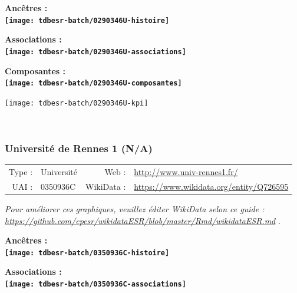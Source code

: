 \documentclass[12pt,french,]{article}
\begin{document}
\vspace{1cm}  
\begin{minipage}[b]{0.50\textwidth}\begin{center} \bf Ancêtres : \\  
\texttt{[image: tdbesr-batch/0290346U-histoire]} \end{center}\end{minipage}\begin{minipage}[b]{0.50\textwidth}\begin{center} \bf Associations : \\  
\texttt{[image: tdbesr-batch/0290346U-associations]} \end{center}\end{minipage}

\hrulefill

\begin{center} \bf Composantes : \\  
\texttt{[image: tdbesr-batch/0290346U-composantes]} \end{center}

\begin{center}\texttt{[image: tdbesr-batch/0290346U-kpi]} \end{center}\checkoddpage

\ifoddpage \fi ~\newpage  

\hypertarget{universituxe9-de-rennes-1-na}{%
\subsubsection{Université de Rennes 1
(N/A)}\label{universituxe9-de-rennes-1-na}}

\begin{tabular*}{\textwidth}{rp{5cm}rl}  
\hline  
Type : & Université & Web : &\href{http://www.univ-rennes1.fr/}{http://www.univ-rennes1.fr/} \\  
UAI : & 0350936C & WikiData : & \href{https://www.wikidata.org/entity/Q726595}{https://www.wikidata.org/entity/Q726595} \\  
\hline  
\end{tabular*}

\textit{\scriptsize Pour améliorer ces graphiques, veuillez éditer WikiData selon ce guide :  \href{https://github.com/cpesr/wikidataESR/blob/master/Rmd/wikidataESR.md}{https://github.com/cpesr/wikidataESR/blob/master/Rmd/wikidataESR.md}}
.

\vspace{1cm}  
\begin{minipage}[b]{0.50\textwidth}\begin{center} \bf Ancêtres : \\  
\texttt{[image: tdbesr-batch/0350936C-histoire]} \end{center}\end{minipage}\begin{minipage}[b]{0.50\textwidth}\begin{center} \bf Associations : \\  
\texttt{[image: tdbesr-batch/0350936C-associations]} \end{center}\end{minipage}
\end{document}
